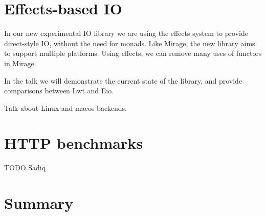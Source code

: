 \documentclass[a4paper,twocolumn]{article}
\begin{document}
\section*{Effects-based IO}

In our new experimental IO library we are using the effects system to provide direct-style IO,
without the need for monads.
Like Mirage, the new library aims to support multiple platforms.
Using effects, we can remove many uses of functors in Mirage.

In the talk we will demonstrate the current state of the library, and provide comparisons between Lwt and Eio.

Talk about Linux and macos backends.

\section*{HTTP benchmarks}

TODO Sadiq

\section*{Summary}
\end{document}
